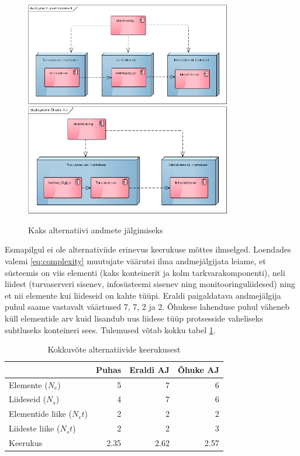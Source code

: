 \documentclass{article}
\begin{document}
\begin{figure}[htp]
	\begin{center}
		\includegraphics[width=9cm]{lisakomponent.png}
		\includegraphics[width=9cm]{ohuke.png}
		\caption{Kaks alternatiivi andmete jälgimiseks}
		\label{fig:complexity:added}
	\end{center}
\end{figure}

Esmapilgul ei ole alternativiide erinevus keerukuse mõttes ilmselged. Loendades valemi \ref{eq:complexity} muutujate väärutsi ilma andmejälgijata leiame, et süsteemis on viis elementi (kaks konteinerit ja kolm tarkvarakomponenti), neli liidest (turvaserveri sisenev, infosüsteemi sisenev ning monitooringuliidesed) ning et nii elemente kui liideseid on kahte tüüpi. Eraldi paigaldatava andmejälgija puhul saame vastavalt väärtused 7, 7, 2 ja 2. Õhukese lahenduse puhul väheneb küll elementide arv kuid lisandub uus liidese tüüp protsesside vaheliseks suhtluseks konteineri sees. Tulemused võtab kokku tabel \ref{tab:complexity}. 

\begin{table}
	\begin{center}
		\begin{tabular}{p{3.6 cm}rrr}
		\toprule
& Puhas & Eraldi AJ & Õhuke AJ \\
		\midrule
Elemente ($N_e$) &	5 &	7 &	6\\
Liideseid  ($N_s$)	& 4 &	7 &	6\\
Elementide liike  ($N_et$)&	2	&2	&2\\
Liideste liike  ($N_st$)&	2 &	2 &	3\\
		\midrule
Keerukus &	2.35 &	2.62	 &2.57\\
		\bottomrule
		\end{tabular}
		\caption{Kokkuvõte alternatiivide keerukusest}
		\label{tab:complexity}

	\end{center}
\end{table}
\end{document}
